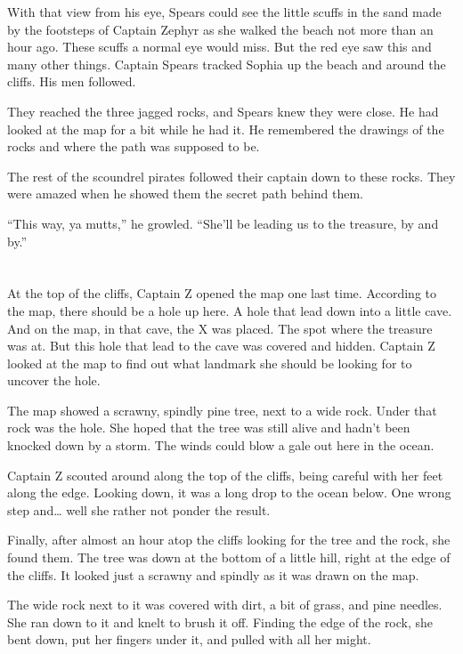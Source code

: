 \documentclass[12pt]{extbook}
\begin{document}
  With that view from his eye, Spears could see the little scuffs in the
  sand made by the footsteps of Captain Zephyr as she walked the beach not
  more than an hour ago. These scuffs a normal eye would miss. But the red
  eye saw this and many other things. Captain Spears tracked Sophia up the
  beach and around the cliffs. His men followed.
  
  They reached the three jagged rocks, and Spears knew they were close. He
  had looked at the map for a bit while he had it. He remembered the
  drawings of the rocks and where the path was supposed to be.
  
  The rest of the scoundrel pirates followed their captain down to these
  rocks. They were amazed when he showed them the secret path behind them.
  
  \enquote{This way, ya mutts,} he growled. \enquote{She'll be leading us
  to the treasure, by and by.}
  
  \section{}\label{section-18}
  
  At the top of the cliffs, Captain Z opened the map one last time.
  According to the map, there should be a hole up here. A hole that lead
  down into a little cave. And on the map, in that cave, the X was placed.
  The spot where the treasure was at. But this hole that lead to the cave
  was covered and hidden. Captain Z looked at the map to find out what
  landmark she should be looking for to uncover the hole.
  
  The map showed a scrawny, spindly pine tree, next to a wide rock. Under
  that rock was the hole. She hoped that the tree was still alive and
  hadn't been knocked down by a storm. The winds could blow a gale out
  here in the ocean.
  
  Captain Z scouted around along the top of the cliffs, being careful with
  her feet along the edge. Looking down, it was a long drop to the ocean
  below. One wrong step and\ldots{} well she rather not ponder the result.
  
  Finally, after almost an hour atop the cliffs looking for the tree and
  the rock, she found them. The tree was down at the bottom of a little
  hill, right at the edge of the cliffs. It looked just a scrawny and
  spindly as it was drawn on the map.
  
  The wide rock next to it was covered with dirt, a bit of grass, and pine
  needles. She ran down to it and knelt to brush it off. Finding the edge
  of the rock, she bent down, put her fingers under it, and pulled with
  all her might.
  
\end{document}
